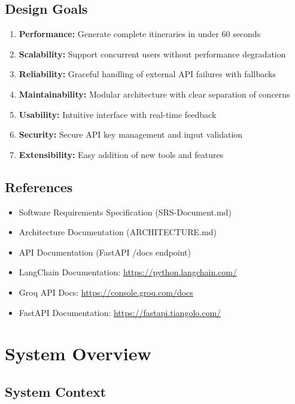 \documentclass[12pt,a4paper]{report}
\begin{document}
\section{Design Goals}

\begin{enumerate}
    \item \textbf{Performance:} Generate complete itineraries in under 60 seconds
    \item \textbf{Scalability:} Support concurrent users without performance degradation
    \item \textbf{Reliability:} Graceful handling of external API failures with fallbacks
    \item \textbf{Maintainability:} Modular architecture with clear separation of concerns
    \item \textbf{Usability:} Intuitive interface with real-time feedback
    \item \textbf{Security:} Secure API key management and input validation
    \item \textbf{Extensibility:} Easy addition of new tools and features
\end{enumerate}

\section{References}

\begin{itemize}
    \item Software Requirements Specification (SRS-Document.md)
    \item Architecture Documentation (ARCHITECTURE.md)
    \item API Documentation (FastAPI /docs endpoint)
    \item LangChain Documentation: \url{https://python.langchain.com/}
    \item Groq API Docs: \url{https://console.groq.com/docs}
    \item FastAPI Documentation: \url{https://fastapi.tiangolo.com/}
\end{itemize}

\chapter{System Overview}

\section{System Context}
\end{document}
